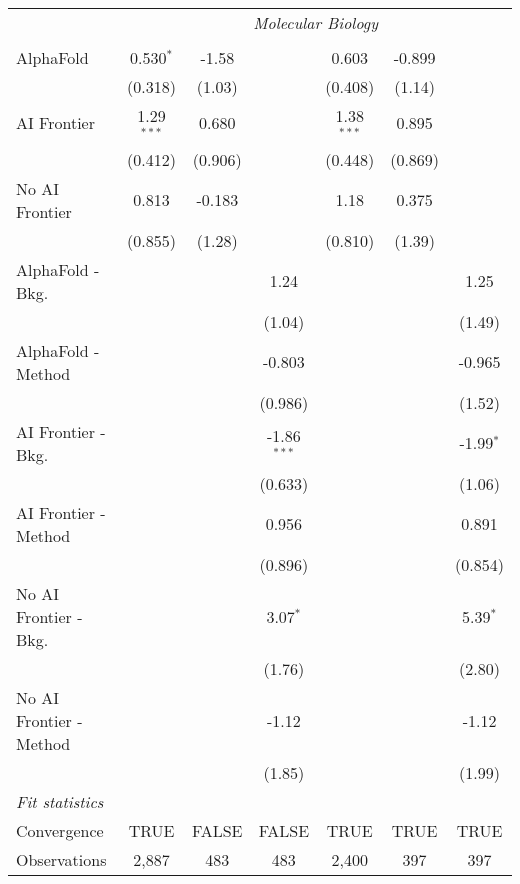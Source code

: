\begin{tabular}{lcccccc}
 & \multicolumn{6}{c}{\textit{Molecular Biology}} \\ \\
   AlphaFold               & 0.530$^{*}$  & -1.58   &               & 0.603        & -0.899  &   \\   
                           & (0.318)      & (1.03)  &               & (0.408)      & (1.14)  &   \\   
   AI Frontier             & 1.29$^{***}$ & 0.680   &               & 1.38$^{***}$ & 0.895   &   \\   
                           & (0.412)      & (0.906) &               & (0.448)      & (0.869) &   \\   
   No AI Frontier          & 0.813        & -0.183  &               & 1.18         & 0.375   &   \\   
                           & (0.855)      & (1.28)  &               & (0.810)      & (1.39)  &   \\   
   AlphaFold - Bkg.        &              &         & 1.24          &              &         & 1.25\\   
                           &              &         & (1.04)        &              &         & (1.49)\\   
   AlphaFold - Method      &              &         & -0.803        &              &         & -0.965\\   
                           &              &         & (0.986)       &              &         & (1.52)\\   
   AI Frontier - Bkg.      &              &         & -1.86$^{***}$ &              &         & -1.99$^{*}$\\   
                           &              &         & (0.633)       &              &         & (1.06)\\   
   AI Frontier - Method    &              &         & 0.956         &              &         & 0.891\\   
                           &              &         & (0.896)       &              &         & (0.854)\\   
   No AI Frontier - Bkg.   &              &         & 3.07$^{*}$    &              &         & 5.39$^{*}$\\   
                           &              &         & (1.76)        &              &         & (2.80)\\   
   No AI Frontier - Method &              &         & -1.12         &              &         & -1.12\\   
                           &              &         & (1.85)        &              &         & (1.99)\\   
   \midrule
   \emph{Fit statistics}\\
   Convergence             &TRUE          & FALSE   & FALSE         & TRUE         & TRUE    & TRUE\\  
   Observations            & 2,887        & 483     & 483           & 2,400        & 397     & 397\\  
   

\end{tabular}
